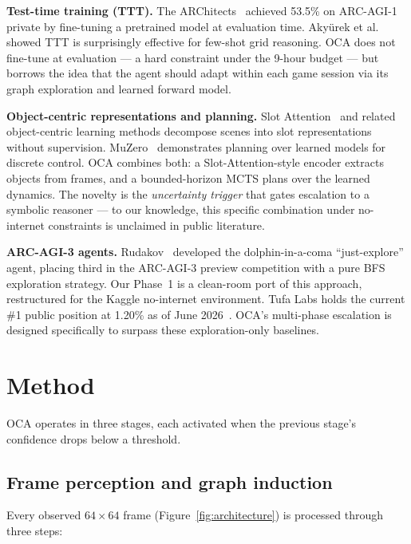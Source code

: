 \documentclass[10pt,letterpaper]{article}
\begin{document}
\textbf{Test-time training (TTT).}
The ARChitects~\cite{architects2024} achieved 53.5\% on ARC-AGI-1 private by fine-tuning a pretrained model at evaluation time.
Aky\"urek et al.~\cite{akyurek2024ttt} showed TTT is surprisingly effective for few-shot grid reasoning.
OCA does not fine-tune at evaluation --- a hard constraint under the 9-hour budget --- but borrows the idea that the agent should adapt within each game session via its graph exploration and learned forward model.

\textbf{Object-centric representations and planning.}
Slot Attention~\cite{locatello2020slot} and related object-centric learning methods decompose scenes into slot representations without supervision.
MuZero~\cite{schrittwieser2020muzero} demonstrates planning over learned models for discrete control.
OCA combines both: a Slot-Attention-style encoder extracts objects from frames, and a bounded-horizon MCTS plans over the learned dynamics.
The novelty is the \textit{uncertainty trigger} that gates escalation to a symbolic reasoner --- to our knowledge, this specific combination under no-internet constraints is unclaimed in public literature.

\textbf{ARC-AGI-3 agents.}
Rudakov~\cite{rudakov2025justexplore} developed the dolphin-in-a-coma ``just-explore'' agent, placing third in the ARC-AGI-3 preview competition with a pure BFS exploration strategy.
Our Phase~1 is a clean-room port of this approach, restructured for the Kaggle no-internet environment.
Tufa Labs holds the current \#1 public position at 1.20\% as of June 2026~\cite{arcprize2026leaderboard}.
OCA's multi-phase escalation is designed specifically to surpass these exploration-only baselines.

\section{Method}\label{sec:method}

OCA operates in three stages, each activated when the previous stage's confidence drops below a threshold.

\subsection{Frame perception and graph induction}\label{sec:method-perception}

Every observed $64\times64$ frame (Figure~\ref{fig:architecture}) is processed through three steps:
\end{document}

